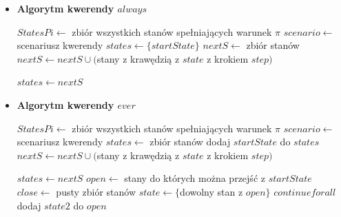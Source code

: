 \documentclass{article}
\begin{document}
\begin{itemize}
    \item \textbf{Algorytm kwerendy $always$}\\

\begin{algorithm}[H]
\begin{algorithmic}
\State $StatesPi \gets $ zbiór wszystkich stanów spełniających warunek $\pi$ 
\State $scenario \gets $ scenariusz kwerendy
    \State $states \gets \{startState\}$
	    \State $nextS \gets $ zbiór stanów
	    	\State $nextS \gets nextS \cup ($stany z krawędzią z $state$ z krokiem $step)$

		\EndFor 
		\State $states \gets nextS$
	\EndFor
	        \State {}
        \EndIf
    \EndFor
\EndFor
\State {}
\end{algorithmic}
\end{algorithm}

    \item \textbf{Algorytm kwerendy $ever$}\\

\begin{algorithm}[H]
\begin{algorithmic}
\State $StatesPi \gets $ zbiór wszystkich stanów spełniających warunek $\pi$ 
\State $scenario \gets $ scenariusz kwerendy
    \State $states \gets$ zbiór stanów
    \State dodaj $startState$ do $states$
		    	\State $nextS \gets nextS \cup ($stany z krawędzią z $state$ z krokiem $step)$

	    \EndFor
		\State $states \gets nextS$
	\EndFor
\EndFor
{}
    \State $open \gets$ stany do których można przejść z $startState$
    \State $close \gets$ pusty zbiór stanów
        \State $state \gets \{$dowolny stan z $open\}$
            \State $continue for all$
        \EndIf
                \State dodaj $state2$ do $open$
            \EndIf
        \EndFor
    \EndWhile
    \State {}
\EndFor
\State {}
\end{algorithmic}
\end{algorithm}


\end{itemize}
\end{document}

